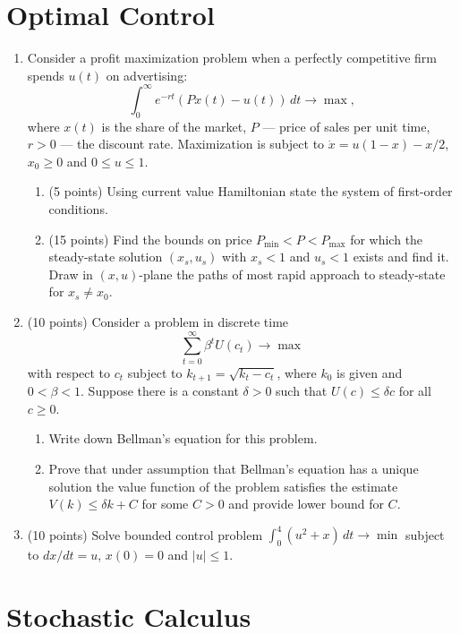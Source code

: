 \documentclass[12pt, a4paper]{article}
\begin{document}
\section*{Optimal Control}

\begin{enumerate}
  \item Consider a profit maximization problem when a perfectly competitive firm spends $u(t)$ on advertising:
  \[
  \int_0^{\infty} e^{-rt} (Px(t) - u(t)) \, dt \to \max,   
  \]
where $x(t)$ is the share of the market, $P$ — price of sales per unit time, $r > 0$ — the discount rate. 
  Maximization is subject to $\dot x = u(1-x) - x/2$, $x_0\geq 0$ and $0 \leq u \leq 1$. 
  \begin{enumerate}
    \item {(5 points)} Using current value Hamiltonian state the system of first-order conditions.  
    \item {(15 points)} Find the bounds on price $P_{\min} < P < P_{\max}$ 
    for which the steady-state solution $(x_s, u_s)$ with $x_s < 1$ and $u_s<1$ exists and find it. 
    Draw in $(x,u)$-plane the paths of most rapid approach to steady-state for $x_s \neq x_0$.
  \end{enumerate}

\item {(10 points)} Consider a problem in discrete time 
\[
  \sum_{t=0}^{\infty} \beta^t U(c_t) \to \max
\] 
with respect to  $c_t$
subject to $k_{t+1} = \sqrt{k_t - c_t}$, 
where $k_0$ is given and $0 < \beta < 1$. 
Suppose there is a constant $\delta > 0$ such that $U(c) \leq \delta c$ for all $c\geq 0$. 
\begin{enumerate}
  \item Write down Bellman’s equation for this problem. 
  \item Prove that under assumption that Bellman’s equation has 
  a unique solution the value function of the problem satisfies the estimate $V(k) \leq \delta k + C$ 
  for some $C>0$ and provide lower bound for $C$.  
\end{enumerate}

\item {(10 points)} Solve bounded control problem $\int_0^4 (u^2 + x) \, dt \to \min$ 
subject to $dx/dt = u$, $x(0)=0$ and $|u| \leq 1$.


\end{enumerate}

\newpage
\section*{Stochastic Calculus}
\end{document}
